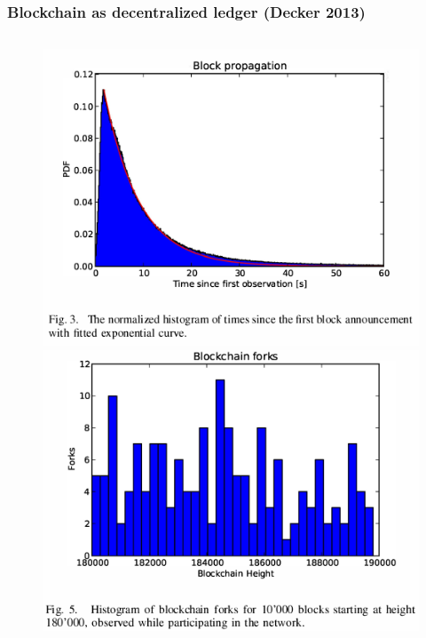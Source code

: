 \documentclass{beamer}
\begin{document}
\begin{frame}
	\frametitle{Blockchain as decentralized ledger (Decker 2013)}
	\begin{columns}
		\begin{column}{0.3\textwidth}
			\begin{figure}
				\centering
				\includegraphics[width=\textwidth]{decker_figures/decker_3.png}
				\includegraphics[width=\textwidth]{decker_figures/decker_5.png}

\end{figure}
\end{column}
\end{columns}
\end{frame}
\end{document}
